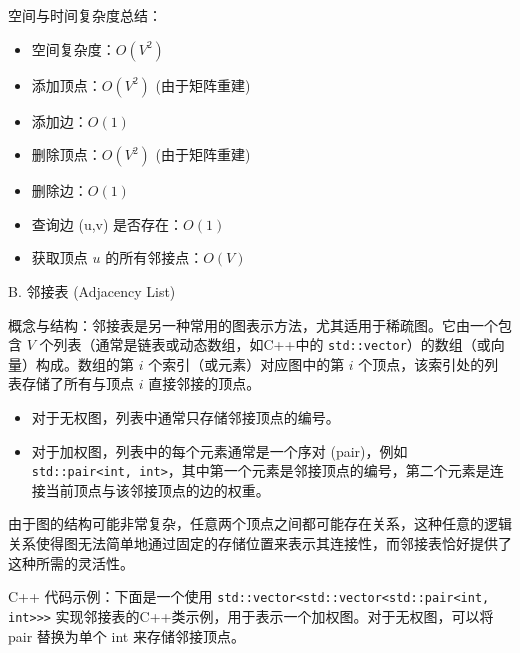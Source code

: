 空间与时间复杂度总结：

\begin{itemize}
	\item 空间复杂度：$O(V^2)$
	\item 添加顶点：$O(V^2)$ (由于矩阵重建)
	\item 添加边：$O(1)$
	\item 删除顶点：$O(V^2)$ (由于矩阵重建)
	\item 删除边：$O(1)$
	\item 查询边 (u,v) 是否存在：$O(1)$
	\item 获取顶点 $u$ 的所有邻接点：$O(V)$
\end{itemize}

B. 邻接表 (Adjacency List)

概念与结构：邻接表是另一种常用的图表示方法，尤其适用于稀疏图。它由一个包含 $V$ 个列表（通常是链表或动态数组，如C++中的 \lstinline{std::vector}）的数组（或向量）构成。数组的第 $i$ 个索引（或元素）对应图中的第 $i$ 个顶点，该索引处的列表存储了所有与顶点 $i$ 直接邻接的顶点。

\begin{itemize}
	\item 对于无权图，列表中通常只存储邻接顶点的编号。
	\item 对于加权图，列表中的每个元素通常是一个序对 (pair)，例如 \lstinline{std::pair<int, int>}，其中第一个元素是邻接顶点的编号，第二个元素是连接当前顶点与该邻接顶点的边的权重。
\end{itemize}

由于图的结构可能非常复杂，任意两个顶点之间都可能存在关系，这种任意的逻辑关系使得图无法简单地通过固定的存储位置来表示其连接性，而邻接表恰好提供了这种所需的灵活性。

C++ 代码示例：下面是一个使用 \lstinline{std::vector<std::vector<std::pair<int, int>>>} 实现邻接表的C++类示例，用于表示一个加权图。对于无权图，可以将 pair 替换为单个 int 来存储邻接顶点。

